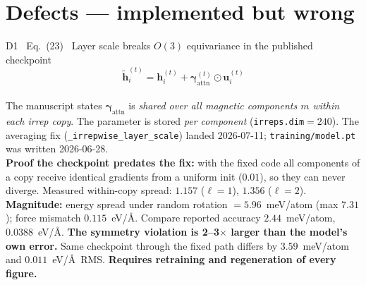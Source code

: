 \documentclass[10pt,a4paper]{article}
\newcommand{\BAD}[1]{\textcolor{BADred}{#1}}
\newcommand{\hh}{\bm{h}}
\newcommand{\code}[1]{\texttt{\small #1}}
\begin{document}
\section{\BAD{Defects --- implemented but wrong}}

\begin{badbox}{D1 \ Eq.~(23) \ Layer scale breaks $O(3)$ equivariance in the published checkpoint}
\vspace{-6pt}
\begin{equation*}
\widetilde{\hh}^{(t)}_i = \hh^{(t)}_i + \bm\gamma^{(t)}_{\mathrm{attn}}\odot\bm u^{(t)}_i
\end{equation*}
\vspace{-8pt}\\
\footnotesize
The manuscript states $\bm\gamma_{\mathrm{attn}}$ is \emph{shared over all magnetic
components $m$ within each irrep copy}. The parameter is stored \emph{per component}
(\code{irreps.dim}$=240$). The averaging fix (\code{\_irrepwise\_layer\_scale}) landed
2026-07-11; \code{training/model.pt} was written 2026-06-28.\\[3pt]
\BAD{\textbf{Proof the checkpoint predates the fix:}} with the fixed code all components of a
copy receive identical gradients from a uniform init ($0.01$), so they can never diverge.
Measured within-copy spread: $1.157$ ($\ell{=}1$), $1.356$ ($\ell{=}2$).\\[3pt]
\BAD{\textbf{Magnitude:}} energy spread under random rotation $= 5.96$~meV/atom (max $7.31$);
force mismatch $0.115$~eV/\AA. Compare reported accuracy $2.44$~meV/atom, $0.0388$~eV/\AA.
\textbf{The symmetry violation is 2--3$\times$ larger than the model's own error.}
Same checkpoint through the fixed path differs by $3.59$~meV/atom and $0.011$~eV/\AA\ RMS.
\textbf{Requires retraining and regeneration of every figure.}
\end{badbox}
\end{document}
